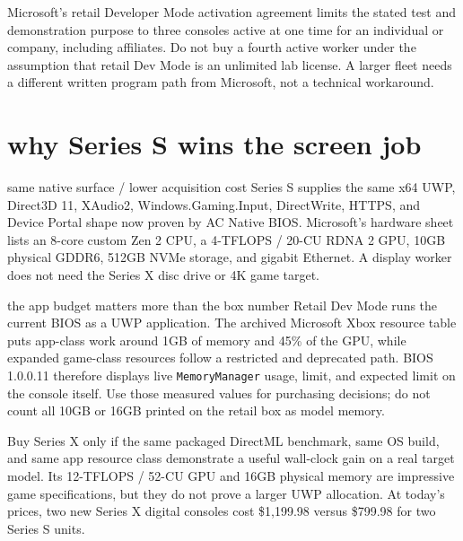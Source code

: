 \documentclass[10pt,letterpaper]{article}
\begin{document}
\begin{gearwarning}
Microsoft's retail Developer Mode activation agreement limits the stated test
and demonstration purpose to three consoles active at one time for an
individual or company, including affiliates. Do not buy a fourth active worker
under the assumption that retail Dev Mode is an unlimited lab license. A larger
fleet needs a different written program path from Microsoft, not a technical
workaround.
\end{gearwarning}

\section{why Series S wins the screen job}

\begin{gearcard}{same native surface / lower acquisition cost}
Series S supplies the same x64 UWP, Direct3D 11, XAudio2,
Windows.Gaming.Input, DirectWrite, HTTPS, and Device Portal shape now proven by
AC Native BIOS. Microsoft's hardware sheet lists an 8-core custom Zen 2 CPU, a
4-TFLOPS / 20-CU RDNA 2 GPU, 10GB physical GDDR6, 512GB NVMe storage, and
gigabit Ethernet. A display worker does not need the Series X disc drive or 4K
game target.
\end{gearcard}

\begin{gearcard}{the app budget matters more than the box number}
Retail Dev Mode runs the current BIOS as a UWP application. The archived
Microsoft Xbox resource table puts app-class work around 1GB of memory and
45\% of the GPU, while expanded game-class resources follow a restricted and
deprecated path. BIOS 1.0.0.11 therefore displays live
\texttt{MemoryManager} usage, limit, and expected limit on the console itself.
Use those measured values for purchasing decisions; do not count all 10GB or
16GB printed on the retail box as model memory.
\end{gearcard}

\begin{gearwarning}
Buy Series X only if the same packaged DirectML benchmark, same OS build, and
same app resource class demonstrate a useful wall-clock gain on a real target
model. Its 12-TFLOPS / 52-CU GPU and 16GB physical memory are impressive game
specifications, but they do not prove a larger UWP allocation. At today's
prices, two new Series X digital consoles cost \$1,199.98 versus \$799.98 for
two Series S units.
\end{gearwarning}
\end{document}
